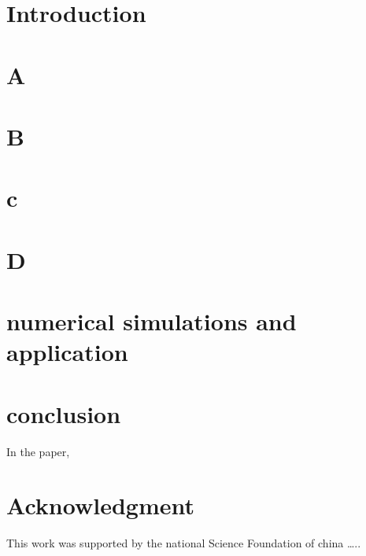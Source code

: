 \documentclass[final,5p,times]{elsarticle}
\begin{document}



\section{Introduction}

\section{A}

\section{B}

\section{c}

\section{D }

\section{numerical simulations and application}

\section{conclusion} In the paper,

\section{Acknowledgment}

This work was supported by the national Science Foundation of china …..




\end{document}
